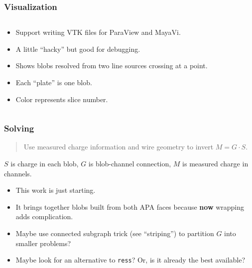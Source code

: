 \documentclass[xcolor=dvipsnames]{beamer}
\begin{document}
\begin{frame}
  \frametitle{Visualization}
  \begin{columns}
    \begin{column}{0.35\textwidth}
      \footnotesize
      
    \begin{itemize}
    \item Support writing VTK files for ParaView and MayaVi.
    \item A little ``hacky'' but good for debugging.
    \item Shows blobs resolved from two line sources crossing at a point.
    \item Each ``plate'' is one blob.  
    \item Color represents slice number.
    \end{itemize}

    \end{column}
    \begin{column}{0.7\textwidth}

      \begin{center}
        \tiny
            
      \end{center}
    \end{column}

  \end{columns}
\end{frame}

\begin{frame}
  \frametitle{Solving}
  \begin{quote}
    Use measured charge information and wire geometry to invert $M=G\cdot S$.
  \end{quote}
  $S$ is charge in each blob, $G$ is blob-channel connection, $M$ is measured charge in channels.
  \begin{itemize}
  \item This work is just starting.
  \item It brings together blobs built from both APA faces because \textbf{now} wrapping adds complication.
  \item Maybe use connected subgraph trick (see ``striping'') to partition $G$ into smaller problems?
  \item Maybe look for an alternative to \texttt{ress}? 
    Or, is it already the best available?
  \end{itemize}

\end{frame}
\end{document}
